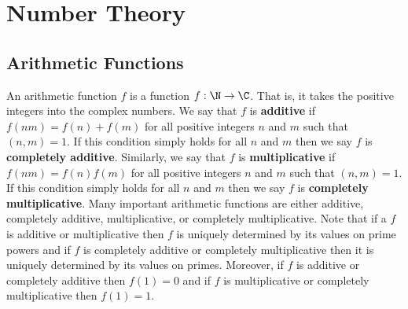 \appendix
\chapter{Number Theory}
  \section{Arithmetic Functions}\label{append:Arithmetic_Functions}
    An arithmetic function $f$ is a function $f:\N \to \C$. That is, it takes the positive integers into the complex numbers. We say that $f$ is \textbf{additive} if $f(nm) = f(n)+f(m)$ for all positive integers $n$ and $m$ such that $(n,m) = 1$. If this condition simply holds for all $n$ and $m$ then we say $f$ is \textbf{completely additive}. Similarly, we say that $f$ is \textbf{multiplicative} if $f(nm) = f(n)f(m)$ for all positive integers $n$ and $m$ such that $(n,m) = 1$. If this condition simply holds for all $n$ and $m$ then we say $f$ is \textbf{completely multiplicative}. Many important arithmetic functions are either additive, completely additive, multiplicative, or completely multiplicative. Note that if a $f$ is additive or multiplicative then $f$ is uniquely determined by its values on prime powers and if $f$ is completely additive or completely multiplicative then it is uniquely determined by its values on primes. Moreover, if $f$ is additive or completely additive then $f(1) = 0$ and if $f$ is multiplicative or completely multiplicative then $f(1) = 1$.

